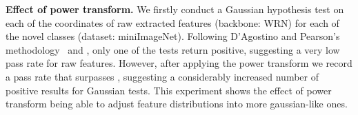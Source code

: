 \documentclass[review]{elsarticle}
\begin{document}
\begin{table}[h!]
    \caption{1-shot and 5-shot accuracy on miniImageNet (backbone: WRN) with different preprocessings on the extracted features.}
    \centering
    \label{tab:res_preprocessing}
\end{table}

\textbf{Effect of power transform.} We firstly
conduct a Gaussian hypothesis test on each of the  coordinates of raw extracted features (backbone: WRN) for each of the  novel classes (dataset: miniImageNet). Following D’Agostino and Pearson’s methodology~\cite{diagostino1971omnibus, d1973tests} and ,   only one of the  tests return positive, suggesting a very low pass rate for raw features. However, after applying the power transform we record a pass rate that surpasses , suggesting a considerably increased number of positive results for Gaussian tests. This experiment shows the effect of power transform being able to adjust feature distributions into more gaussian-like ones.
\end{document}
